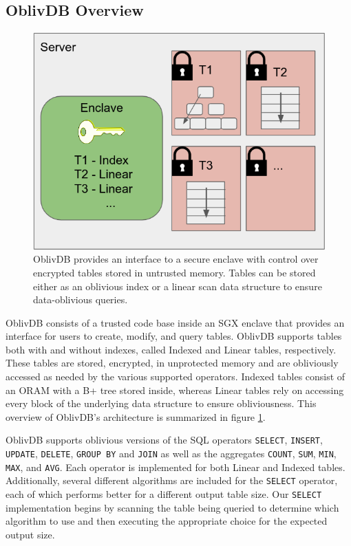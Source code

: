 \documentclass[USenglish,oneside,twocolumn]{article}
\def\name/{OblivDB}
\begin{document}
\subsection{\name/ Overview}
\begin{figure}
\includegraphics[width=\linewidth]{figure_server.png}
\caption{\name/ provides an interface to a secure enclave with control over encrypted tables stored in untrusted memory. Tables can be stored either as an oblivious index or a linear scan data structure to ensure data-oblivious queries.}
\label{arch}
\end{figure}
\name/ consists of a trusted code base inside an SGX enclave that provides an interface for users to create, modify, and query tables. \name/ supports tables both with and without indexes, called Indexed and Linear tables, respectively. These tables are stored, encrypted, in unprotected memory and are obliviously accessed as needed by the various supported operators. Indexed tables consist of an ORAM with a B+ tree stored inside, whereas Linear tables rely on accessing every block of the underlying data structure to ensure obliviousness. This overview of \name/'s architecture is summarized in figure \ref{arch}.

  \name/ supports oblivious versions of the SQL operators \texttt{SELECT}, \texttt{INSERT}, \texttt{UPDATE}, \texttt{DELETE}, \texttt{GROUP BY} and \texttt{JOIN} as well as the aggregates \texttt{COUNT}, \texttt{SUM}, \texttt{MIN}, \texttt{MAX}, and \texttt{AVG}. Each operator is implemented for both Linear and Indexed tables. Additionally, several different algorithms are included for the \texttt{SELECT} operator, each of which performs better for a different output table size. Our \texttt{SELECT} implementation begins by scanning the table being queried to determine which algorithm to use and then executing the appropriate choice for the expected output size. 
  
\end{document}
